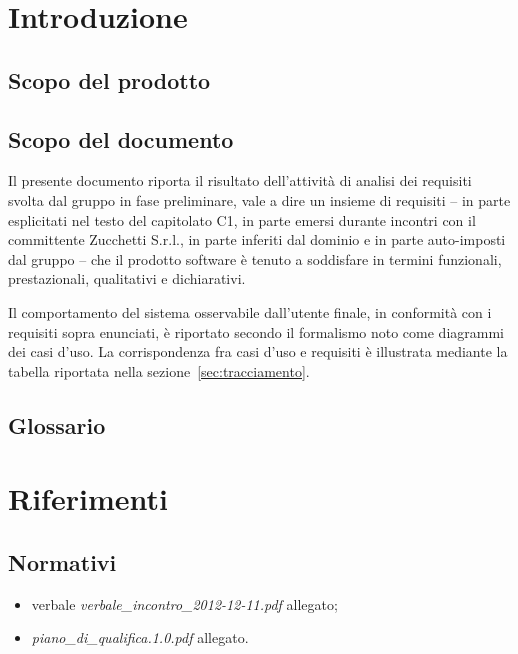 

\setcounter{page}{1}
\pagestyle{normal}


\section{Introduzione}
\subsection{Scopo del prodotto}
\purpose

\subsection{Scopo del documento}
Il presente documento riporta il risultato dell'attività di analisi dei requisiti svolta dal gruppo \team{} in fase preliminare, vale a dire un insieme di requisiti -- in parte esplicitati nel testo del capitolato C1, in parte emersi durante incontri con il committente Zucchetti S.r.l., in parte inferiti dal dominio e in parte auto-imposti dal gruppo -- che il prodotto software è tenuto a soddisfare in termini funzionali, prestazionali, qualitativi e dichiarativi.

Il comportamento del sistema osservabile dall'utente finale, in conformità con i requisiti sopra enunciati, è riportato secondo il formalismo noto come diagrammi dei casi d'uso. La corrispondenza fra casi d'uso e requisiti è illustrata mediante la tabella riportata nella sezione~\ref{sec:tracciamento}.

\subsection{Glossario}
\glossaryIntro

\clearpage
\section{Riferimenti}

\subsection{Normativi}
\begin{itemize}
\item[] verbale \textit{verbale\_incontro\_2012-12-11.pdf} allegato;
\item[] \textit{piano\_di\_qualifica.1.0.pdf} allegato.
\end{itemize}

